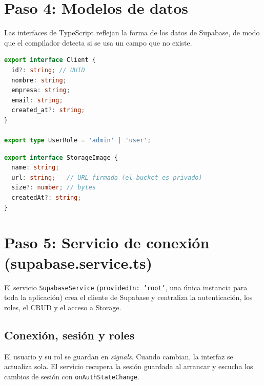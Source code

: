 \documentclass[a4paper, 12pt]{article}
\begin{document}
\section{Paso 4: Modelos de datos}

Las interfaces de TypeScript reflejan la forma de los datos de Supabase, de
modo que el compilador detecta si se usa un campo que no existe.

\begin{lstlisting}[language=TypeScript, caption={src/app/models/client.model.ts}]
export interface Client {
  id?: string; // UUID
  nombre: string;
  empresa: string;
  email: string;
  created_at?: string;
}

export type UserRole = 'admin' | 'user';
\end{lstlisting}

\begin{lstlisting}[language=TypeScript, caption={src/app/models/storage-image.model.ts}]
export interface StorageImage {
  name: string;
  url: string;   // URL firmada (el bucket es privado)
  size?: number; // bytes
  createdAt?: string;
}
\end{lstlisting}

\section{Paso 5: Servicio de conexión (supabase.service.ts)}

El servicio \texttt{SupabaseService} (\texttt{providedIn: 'root'}, una única
instancia para toda la aplicación) crea el cliente de Supabase y centraliza la
autenticación, los roles, el CRUD y el acceso a Storage.

\subsection{Conexión, sesión y roles}

El usuario y su rol se guardan en \textit{signals}. Cuando cambian, la
interfaz se actualiza sola. El servicio recupera la sesión guardada al
arrancar y escucha los cambios de sesión con \texttt{onAuthStateChange}.
\end{document}
